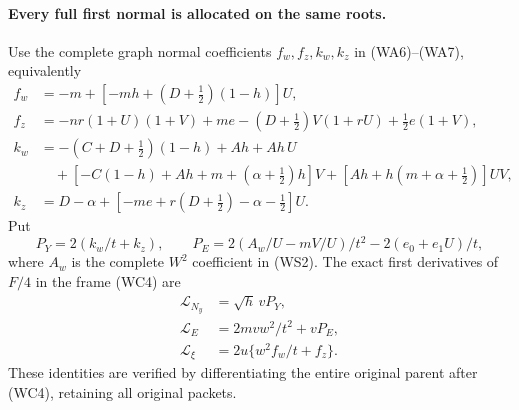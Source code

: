 \paragraph{Every full first normal is allocated on the same roots.}
Use the complete graph normal coefficients $f_w,f_z,k_w,k_z$ in
(WA6)--(WA7), equivalently
\[
\begin{aligned}
 f_w&=-m+[-mh+(D+\tfrac12)(1-h)]U,\\
 f_z&=-nr(1+U)(1+V)+me-(D+\tfrac12)V(1+rU)
                                      +\tfrac12e(1+V),\\
 k_w&=-(C+D+\tfrac12)(1-h)+Ah+Ah\,U\\
 &\quad+[-C(1-h)+Ah+m+(\alpha+\tfrac12)h]V
                  +[Ah+h(m+\alpha+\tfrac12)]UV,\\
 k_z&=D-\alpha+[-me+r(D+\tfrac12)-\alpha-\tfrac12]U.
\end{aligned}                                                    \tag{WC13}
\]
Put
\[
 P_Y=2(k_w/t+k_z),\qquad
 P_E=2(A_w/U-mV/U)/t^2-2(e_0+e_1U)/t,
\]
where $A_w$ is the complete $W^2$ coefficient in (WS2).
The exact first derivatives of $F/4$ in the frame (WC4) are
\[
\begin{aligned}
 \mathcal L_{N_y}&=\sqrt h\,vP_Y,\\
 \mathcal L_E&=2mvw^2/t^2+vP_E,\\
 \mathcal L_\xi&=2u\{w^2f_w/t+f_z\}.
\end{aligned}                                                    \tag{WC14}
\]
These identities are verified by differentiating the entire original
parent after (WC4), retaining all original packets.

